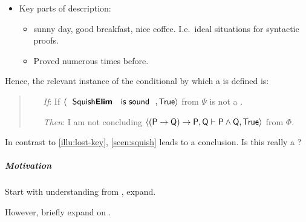 \begin{note}
\begin{itemize}[noitemsep]
{      For, my conclusion is .
      My conclusion is not .
    }
  \item
    Key parts of description:
    \begin{itemize}[noitemsep]
    \item
      sunny day, good breakfast, nice coffee.
      I.e.\ ideal situations for syntactic proofs.
    \item
      Proved \sqE{} numerous times before.
    \end{itemize}
  \end{itemize}

  Hence, the relevant instance of the conditional by which a \requ{} is defined is:

  \begin{quote}
    \begin{itemize}
    \item[\emph{If}:]
      If \(\pv{\propI{\sqE{} is sound}}{\valI{True}}\) from \(\Psi\) is not a \fc{}.
    \item[\emph{Then}:]
      I am not concluding \(\langle \mathsf{(P \rightarrow Q) \rightarrow P, Q \vdash P \land Q}, \text{\textsf{True}} \rangle\) from \(\Phi\).
    \end{itemize}
  \end{quote}

  In contrast to \autoref{illu:lost-key}, \autoref{scen:squish} leads to a conclusion.
  Is this really a \requ{}?
\end{note}

\subparagraph{Motivation}

\begin{note}
  Start with understanding from , expand.

  However, briefly expand on \sqE{}.
\end{note}

